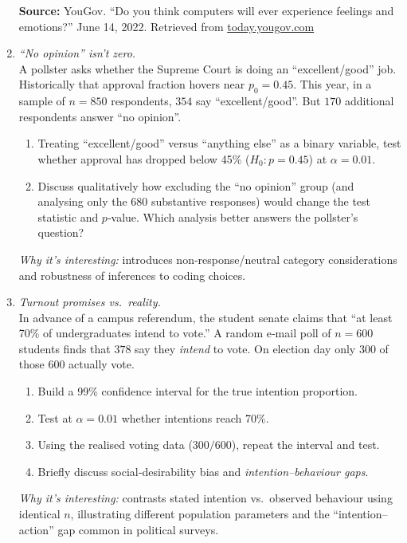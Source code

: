 \documentclass[11pt]{article}
\begin{document}
\begin{enumerate}[label=\textbf{Q\,\arabic*:}, left=0pt]
      \vspace{0.5em}
      \noindent\textbf{Source:} YouGov. “Do you think computers will ever experience feelings and emotions?” June 14, 2022. Retrieved from \href{https://today.yougov.com/}{today.yougov.com}

\item  \emph{ “No opinion” isn’t zero.}  \\
      A pollster asks whether the Supreme Court is doing an “excellent/good” job.
      Historically that approval fraction hovers near $p_0=0.45$.
      This year, in a sample of $n=850$ respondents, $354$ say “excellent/good”.
      But $170$ additional respondents answer “no opinion”.
      \begin{enumerate}[label=(\alph*)]
         \item Treating “excellent/good” versus “anything else” as a binary variable, test whether approval has dropped below 45\% ($H_0{:}p=0.45$) at $\alpha=0.01$.
         \item Discuss qualitatively how excluding the “no opinion” group (and analysing only the 680 substantive responses) would change the test statistic and $p$‑value.  Which analysis better answers the pollster’s question?
      \end{enumerate}
      \textit{Why it’s interesting:}  introduces non‑response/neutral category considerations and robustness of inferences to coding choices.

\item  \emph{Turnout promises vs.\ reality.}  \\
      In advance of a campus referendum, the student senate claims that “at least 70\% of undergraduates intend to vote.”
      A random e‑mail poll of $n=600$ students finds that $378$ say they \emph{intend} to vote.
      On election day only $300$ of those 600 actually vote.
      \begin{enumerate}[label=(\alph*)]
         \item Build a 99\% confidence interval for the true intention proportion.
         \item Test at $\alpha=0.01$ whether intentions reach 70\%.
         \item Using the realised voting data ($300/600$), repeat the interval and test.
         \item Briefly discuss social‑desirability bias and \emph{intention–behaviour gaps}.
      \end{enumerate}
      \textit{Why it’s interesting:}  contrasts stated intention vs.\ observed behaviour using identical $n$, illustrating different population parameters and the “intention–action” gap common in political surveys.


\end{enumerate}
\end{document}
